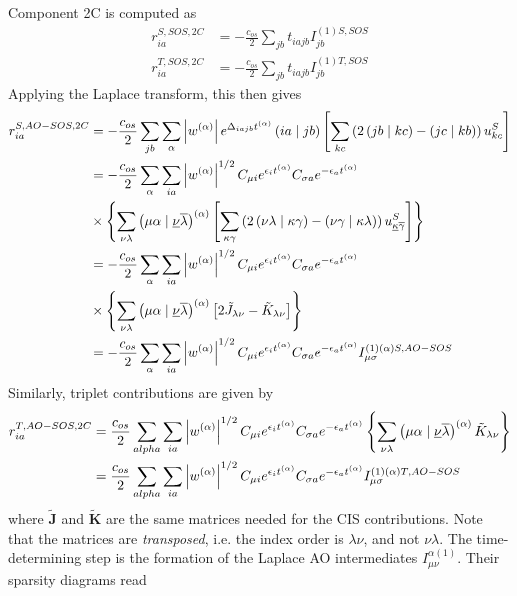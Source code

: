 Component 2C is computed as
\begin{align}
r_{ia}^{S,SOS,2C} &= -\frac{c_{os}}{2} \sum_{jb} t_{iajb} I^{(1)S,SOS}_{jb} \\
r_{ia}^{T,SOS,2C} &= -\frac{c_{os}}{2} \sum_{jb} t_{iajb} I^{(1)T,SOS}_{jb}
\end{align}
\noindent Applying the Laplace transform, this then gives
\begin{align}
\begin{split}
r_{ia}^{S,AO-SOS,2C} &= -\frac{c_{os}}{2} \sum_{jb} \sum_{\alpha} \left\lvert w^{(\alpha)} \right\rvert e^{\Delta_{iajb}t^{(\alpha)}} \left( ia \mid jb \right) \left[\sum_{kc} \left(2\left( jb \mid kc \right) - \left( jc \mid kb \right) \right) u_{kc}^S \right] \\
&=  -\frac{c_{os}}{2} \sum_{\alpha} \sum_{ia} \left\lvert w^{(\alpha)} \right\rvert^{1/2} C_{\mu i} e^{\epsilon_i t^{(\alpha)}} C_{\sigma a} e^{-\epsilon_a t^{(\alpha)}} \\
& \times \left\lbrace \sum_{\nu\lambda} \left( \mu\alpha \mid \underline{\nu}\overline{\lambda} \right)^{(\alpha)} \left[ \sum_{\kappa\gamma}  \left( 2\left( \nu\lambda \mid \kappa\gamma \right) - \left( \nu\gamma \mid \kappa\lambda \right)\right) u^S_{\underline{\kappa}\overline{\gamma}} \right] \right\rbrace \\
&=   -\frac{c_{os}}{2} \sum_{\alpha} \sum_{ia} \left\lvert w^{(\alpha)} \right\rvert^{1/2} C_{\mu i} e^{\epsilon_i t^{(\alpha)}} C_{\sigma a} e^{-\epsilon_a t^{(\alpha)}} \\
& \times \left\lbrace \sum_{\nu\lambda} \left( \mu\alpha \mid \underline{\nu}\overline{\lambda} \right)^{(\alpha)} \left[ 2\tilde{J}_{\lambda\nu} - \tilde{K}_{\lambda\nu} \right] \right\rbrace \\
&= -\frac{c_{os}}{2} \sum_{\alpha} \sum_{ia} \left\lvert w^{(\alpha)} \right\rvert^{1/2} C_{\mu i} e^{\epsilon_i t^{(\alpha)}} C_{\sigma a} e^{-\epsilon_a t^{(\alpha)}} I^{(1)(\alpha)S,AO-SOS}_{\mu \sigma}
\end{split} 
\end{align}
\noindent Similarly, triplet contributions are given by
\begin{align}
\begin{split}
r_{ia}^{T,AO-SOS,2C} &= \frac{c_{os}}{2} \sum_{alpha} \sum_{ia} \left\lvert w^{(\alpha)} \right\rvert^{1/2} C_{\mu i} e^{\epsilon_i t^{(\alpha)}} C_{\sigma a} e^{-\epsilon_a t^{(\alpha)}} \left\lbrace \sum_{\nu\lambda} \left( \mu\alpha \mid \underline{\nu}\overline{\lambda} \right)^{(\alpha)} \tilde{K}_{\lambda\nu} \right\rbrace \\
&= \frac{c_{os}}{2} \sum_{alpha} \sum_{ia} \left\lvert w^{(\alpha)} \right\rvert^{1/2} C_{\mu i} e^{\epsilon_i t^{(\alpha)}} C_{\sigma a} e^{-\epsilon_a t^{(\alpha)}} I^{(1)(\alpha)T,AO-SOS}_{\mu \sigma}
\end{split}
\end{align}
\noindent where $\mathbf{\tilde{J}}$ and $\mathbf{\tilde{K}}$ are the same matrices needed for the CIS contributions. Note that the matrices are \emph{transposed}, i.e. the index order is $\lambda\nu$, and not $\nu\lambda$. The time-determining step is the formation of the Laplace AO intermediates $I_{\mu\nu}^{\alpha(1)}$. Their sparsity diagrams read
